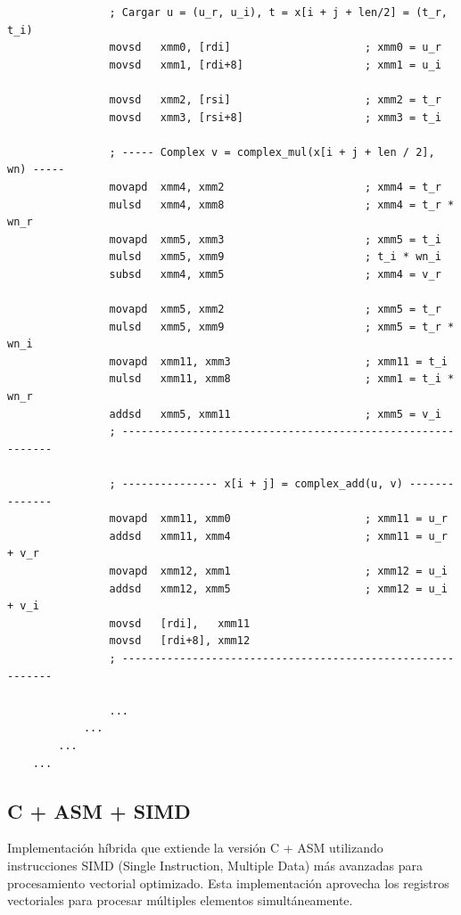 \documentclass[a4paper]{article}
\begin{document}
\begin{verbatim}
                ; Cargar u = (u_r, u_i), t = x[i + j + len/2] = (t_r, t_i)
                movsd   xmm0, [rdi]                     ; xmm0 = u_r
                movsd   xmm1, [rdi+8]                   ; xmm1 = u_i

                movsd   xmm2, [rsi]                     ; xmm2 = t_r
                movsd   xmm3, [rsi+8]                   ; xmm3 = t_i

                ; ----- Complex v = complex_mul(x[i + j + len / 2], wn) -----
                movapd  xmm4, xmm2                      ; xmm4 = t_r
                mulsd   xmm4, xmm8                      ; xmm4 = t_r * wn_r
                movapd  xmm5, xmm3                      ; xmm5 = t_i
                mulsd   xmm5, xmm9                      ; t_i * wn_i
                subsd   xmm4, xmm5                      ; xmm4 = v_r

                movapd  xmm5, xmm2                      ; xmm5 = t_r
                mulsd   xmm5, xmm9                      ; xmm5 = t_r * wn_i
                movapd  xmm11, xmm3                     ; xmm11 = t_i
                mulsd   xmm11, xmm8                     ; xmm1 = t_i * wn_r
                addsd   xmm5, xmm11                     ; xmm5 = v_i
                ; -----------------------------------------------------------

                ; --------------- x[i + j] = complex_add(u, v) --------------
                movapd  xmm11, xmm0                     ; xmm11 = u_r
                addsd   xmm11, xmm4                     ; xmm11 = u_r + v_r
                movapd  xmm12, xmm1                     ; xmm12 = u_i
                addsd   xmm12, xmm5                     ; xmm12 = u_i + v_i
                movsd   [rdi],   xmm11
                movsd   [rdi+8], xmm12
                ; -----------------------------------------------------------

                ...
            ...
        ...
    ...
\end{verbatim}

\subsection{C + ASM + SIMD}

Implementación híbrida que extiende la versión C + ASM utilizando instrucciones SIMD (Single Instruction, Multiple Data) más avanzadas para procesamiento vectorial optimizado. Esta implementación aprovecha los registros vectoriales para procesar múltiples elementos simultáneamente.
\end{document}
